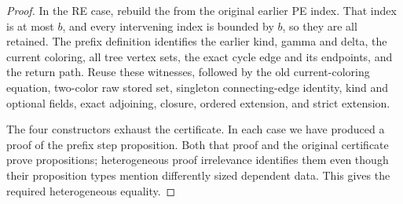 \begin{proof}
In the RE case, rebuild the
 from the original earlier PE index.
That index is at most \(b\), and every intervening index is bounded by \(b\),
so they are all retained.  The prefix definition identifies the earlier kind,
gamma and delta, the current coloring, all tree vertex sets, the exact cycle
edge and its endpoints, and the return path.  Reuse these witnesses, followed
by the old current-coloring equation, two-color raw stored set, singleton
connecting-edge identity, kind and optional fields, exact adjoining, closure,
ordered extension, and strict extension.

The four constructors exhaust the certificate.  In each case we have produced
a proof of the prefix step proposition.  Both that proof and the original
certificate prove propositions; heterogeneous proof irrelevance identifies
them even though their proposition types mention differently sized dependent
data.  This gives the required heterogeneous equality.
\end{proof}
